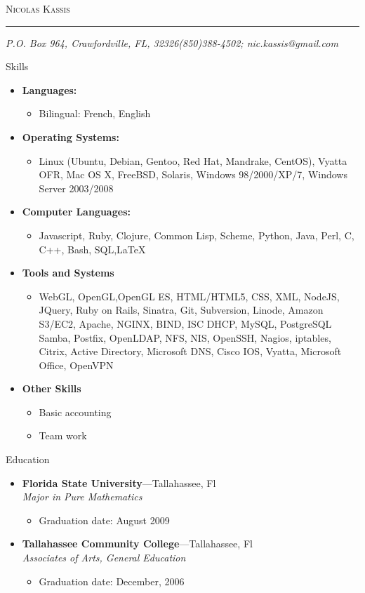 \documentclass[11pt,oneside]{article}
\makeatletter
\newcommand{\name}{Nicolas Kassis}
\newcommand{\addr}{P.O. Box 964, Crawfordville, FL, 32326}
\newcommand{\phone}{(850)388-4502}
\newcommand{\email}{nic.kassis@gmail.com}
\newcommand{\bigname}[1]{
	\begin{center}\fontfamily{phv}\selectfont\Huge\scshape#1\end{center}
}
\newenvironment{ressection}[1]{
	\vspace{4pt}
	{\fontfamily{phv}\selectfont\Large#1}
	\begin{itemize}
	\vspace{3pt}
}{
	\end{itemize}
}
\newcommand{\resitem}[1]{
	\vspace{-4pt}
	\item \begin{flushleft} #1 \end{flushleft}
}
\newcommand{\ressubitem}[1]{
	\vspace{-1pt}
	\item \begin{flushleft} #1 \end{flushleft}
}
\newcommand{\resbigitem}[3]{
	\vspace{-5pt}
	\item
	\textbf{#1}---#2 \\
	\textit{#3}
}
\newenvironment{ressubsec}[3]{
	\resbigitem{#1}{#2}{#3}
	\vspace{-2pt}
	\begin{itemize}
}{
	\end{itemize}
}
\newenvironment{reslist}[1]{
	\resitem{\textbf{#1}}
	\vspace{-5pt}
	\begin{itemize}
}{
	\end{itemize}
}
\makeatother
\begin{document}
 \selectfont

\bigname{\name}

\vspace{-8pt} \rule{\textwidth}{1pt}

\vspace{-1pt} {\small\itshape \addr \hfill \phone; \email}

\vspace{8 pt}

\begin{ressection}{Skills}
       \begin{reslist}{Languages:}
		\ressubitem{Bilingual: French, English}
        \end{reslist}
	\begin{reslist}{Operating Systems:}
                \ressubitem{Linux (Ubuntu, Debian, Gentoo, Red Hat, Mandrake, CentOS), Vyatta OFR, Mac OS X, FreeBSD, Solaris, Windows 98/2000/XP/7, Windows Server 2003/2008}
	\end{reslist}
	\begin{reslist}{Computer Languages:}
	  \ressubitem{Javascript, Ruby, Clojure, Common Lisp, Scheme, Python, Java, Perl, C, C++, Bash, SQL,\LaTeX}
        \end{reslist}
        \begin{reslist}{Tools and Systems}
	\ressubitem{WebGL, OpenGL,OpenGL ES, HTML/HTML5, CSS,  XML, NodeJS, JQuery, Ruby on Rails, Sinatra, Git, Subversion, Linode, Amazon S3/EC2, Apache, NGINX, BIND, ISC DHCP, MySQL, PostgreSQL Samba, Postfix, OpenLDAP, NFS, NIS, OpenSSH, Nagios, iptables,  Citrix, Active Directory, Microsoft DNS, Cisco IOS, Vyatta,  Microsoft Office, OpenVPN }
        \end{reslist}
        \begin{reslist}{Other Skills}
          \ressubitem{Basic accounting}
          \ressubitem{Team work} 
        \end{reslist}


\end{ressection}

\begin{ressection}{Education}

  \begin{ressubsec}{Florida State University}{Tallahassee, Fl}{Major in Pure Mathematics}
		\ressubitem{Graduation date: August 2009}
  \end{ressubsec}
\begin{ressubsec}{Tallahassee Community College}{Tallahassee, Fl}{Associates of Arts, General Education}
		\ressubitem{Graduation date: December, 2006}
\end{ressubsec}

\end{ressection}
\end{document}
